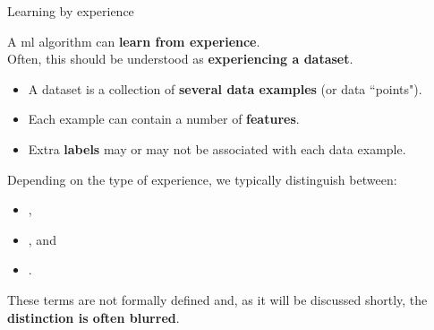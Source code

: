 %
%
%

\begin{frame}[t]{Learning by experience}

    A \gls{ml} algorithm can {\bf learn from experience}.\\
    \vspace{0.2cm}
    Often, this should be understood as {\bf experiencing a dataset}.
    \begin{itemize}
        \small
        \item 
        A dataset is a collection of {\bf several data examples} (or data ``points").\\
        \item 
        Each example can contain a number of {\bf features}.
        \item 
        Extra {\bf labels} may or may not be associated with each data example.\\
    \end{itemize}
    \vspace{0.1cm}
    Depending on the type of experience,
    we typically distinguish between:\\
    \vspace{0.1cm}
    \begin{itemize}
        \item 
        ,
        \item 
        , and
        \item 
        .\\
    \end{itemize}
    \vspace{0.1cm}
    These terms are not formally defined and, as it will be discussed shortly, 
    the {\bf distinction is often blurred}.\\

\end{frame}


